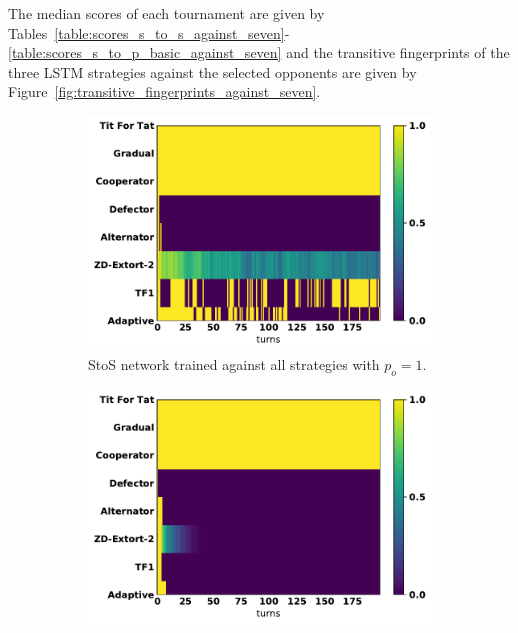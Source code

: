 The median scores of each tournament are given by
Tables~\ref{table:scores_s_to_s_against_seven}-
\ref{table:scores_s_to_p_basic_against_seven} and the transitive fingerprints of
the three LSTM strategies against the selected opponents are given by
Figure~\ref{fig:transitive_fingerprints_against_seven}.

\begin{figure}[!htbp]
    \begin{subfigure}{.32\textwidth}
        \includegraphics[width=\textwidth]{src/chapters/07/img/s_t_s_against_seven_opponents.pdf}
        \caption{StoS network trained
        against all strategies with $p_o=1$.}
    \end{subfigure}\hfill
\begin{subfigure}{.32\textwidth}
        \includegraphics[width=\textwidth]{src/chapters/07/img/s_t_p_twenty_against_seven_opponents.pdf}

\end{subfigure}
\end{figure}
